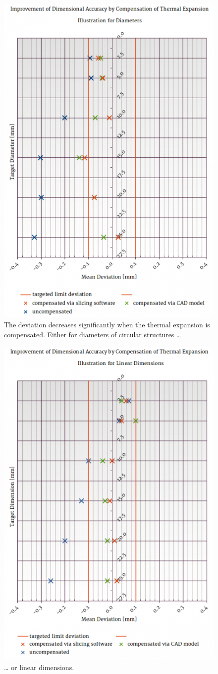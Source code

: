 \begin{figure}[H]
  \centering
  \includegraphics[width=.7\linewidth]{./img/cylindric_pyramid_mean-values.png}
  \caption{The deviation decreases significantly when the thermal expansion is compensated.
           Either for diameters of circular structures …}
\end{figure}

\begin{figure}[H]
  \centering
  \includegraphics[width=.7\linewidth]{./img/cubic_pyramid_mean-values.png}
  \caption{… or linear dimensions.}
\end{figure}

